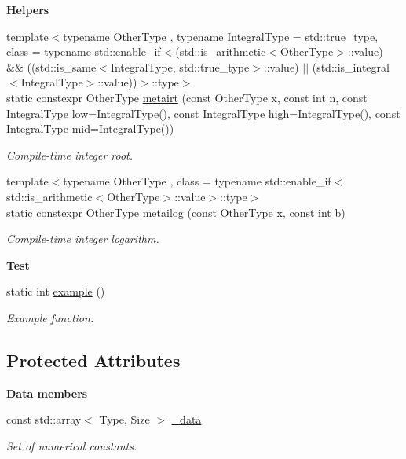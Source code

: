 \begin{Indent}{\bf Helpers}
\begin{DoxyCompactItemize}
{\footnotesize template$<$typename Other\-Type , typename Integral\-Type  = std\-::true\-\_\-type, class  = typename std\-::enable\-\_\-if$<$(std\-::is\-\_\-arithmetic$<$\-Other\-Type$>$\-::value) \&\& ((std\-::is\-\_\-same$<$\-Integral\-Type, std\-::true\-\_\-type$>$\-::value) $|$$|$ (std\-::is\-\_\-integral$<$\-Integral\-Type$>$\-::value))$>$\-::type$>$ }\\static constexpr Other\-Type \hyperlink{exceptionmagrathea_1_1Constant_a3107afd4bae68ed825c61e7ddf1a1942}{metairt} (const Other\-Type x, const int n, const Integral\-Type low=Integral\-Type(), const Integral\-Type high=Integral\-Type(), const Integral\-Type mid=Integral\-Type())
\begin{DoxyCompactList}\small\item\em Compile-\/time integer root. \end{DoxyCompactList}\item 
{\footnotesize template$<$typename Other\-Type , class  = typename std\-::enable\-\_\-if$<$std\-::is\-\_\-arithmetic$<$\-Other\-Type$>$\-::value$>$\-::type$>$ }\\static constexpr Other\-Type \hyperlink{exceptionmagrathea_1_1Constant_a7082ad2753e3574c720b08c57d676c11}{metailog} (const Other\-Type x, const int b)
\begin{DoxyCompactList}\small\item\em Compile-\/time integer logarithm. \end{DoxyCompactList}\end{DoxyCompactItemize}
\end{Indent}
\begin{Indent}{\bf Test}\par
\begin{DoxyCompactItemize}
\item 
static int \hyperlink{exceptionmagrathea_1_1Constant_a8f2832bf218014ca03a14a2c9998084d}{example} ()
\begin{DoxyCompactList}\small\item\em Example function. \end{DoxyCompactList}\end{DoxyCompactItemize}
\end{Indent}
\subsection*{Protected Attributes}
\begin{Indent}{\bf Data members}\par
\begin{DoxyCompactItemize}
\item 
const std\-::array$<$ Type, Size $>$ \hyperlink{exceptionmagrathea_1_1Constant_a00180da842634dbab0822eb25b33ed21}{\-\_\-data}
\begin{DoxyCompactList}\small\item\em Set of numerical constants. \end{DoxyCompactList}\end{DoxyCompactItemize}
\end{Indent}
